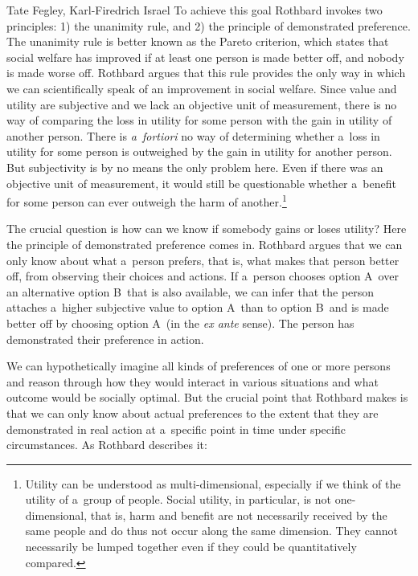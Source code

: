 \begin{artengenv2auth}{Tate Fegley, Karl-Firedrich Israel}
To achieve this goal Rothbard invokes two principles: 1) the unanimity rule, and 2) the principle of demonstrated preference. The unanimity rule is better known as the Pareto criterion, which states that social welfare has improved if at least one person is made better off, and nobody is made worse off. Rothbard argues that this rule provides the only way in which we can scientifically speak of an improvement in social welfare. Since value and utility are subjective and we lack an objective unit of measurement, there is no way of comparing the loss in utility for some person with the gain in utility of another person. There is \textit{a~fortiori} no way of determining whether a~loss in utility for some person is outweighed by the gain in utility for another person. But subjectivity is by no means the only problem here. Even if there was an objective unit of measurement, it would still be questionable whether a~benefit for some person can ever outweigh the harm of another.\footnote{Utility can be understood as multi-dimensional, especially if we think of the utility of a~group of people. Social utility, in particular, is not one-dimensional, that is, harm and benefit are not necessarily received by the same people and do thus not occur along the same dimension. They cannot necessarily be lumped together even if they could be quantitatively compared. }



The crucial question is how can we know if somebody gains or loses utility? Here the principle of demonstrated preference comes in. Rothbard argues that we can only know about what a~person prefers, that is, what makes that person better off, from observing their choices and actions. If a~person chooses option A~over an alternative option B~that is also available, we can infer that the person attaches a~higher subjective value to option A~than to option B~and is made better off by choosing option A~(in the \textit{ex ante} sense). The person has demonstrated their preference in action.



We can hypothetically imagine all kinds of preferences of one or more persons and reason through how they would interact in various situations and what outcome would be socially optimal. But the crucial point that Rothbard makes is that we can only know about actual preferences to the extent that they are demonstrated in real action at a~specific point in time under specific circumstances. As Rothbard 
\parencite*[][p.320]{rothbard_toward_2011} %
 describes it:




\end{artengenv2auth}
